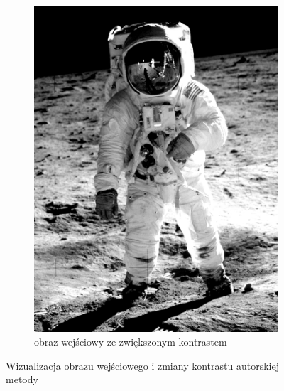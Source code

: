 \documentclass[a4paper, 12pt, polish, twoside]{extreport}
\begin{document}
\begin{figure}[H]
\begin{subfigure}{0.49\textwidth}
            \includegraphics[width = \textwidth]{img/4-mine/input-input_c20.png}
            \caption{obraz wejściowy ze zwiększonym kontrastem}
            \label{mine-input-1-b}
        \end{subfigure}
        \caption{Wizualizacja obrazu wejściowego i zmiany kontrastu autorskiej metody}
        \label{mine-input-1}
    \end{figure}
        
\end{document}
